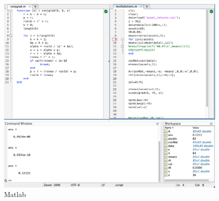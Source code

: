 \documentclass[12pt,twoside]{article}
\begin{document}
\begin{figure}[]
\centering %
\includegraphics[width = 1.0\hsize]{./figures/ss.png} %
\caption{Matlab}
\label{fig: Matlab}
\end{figure}
\end{document}
